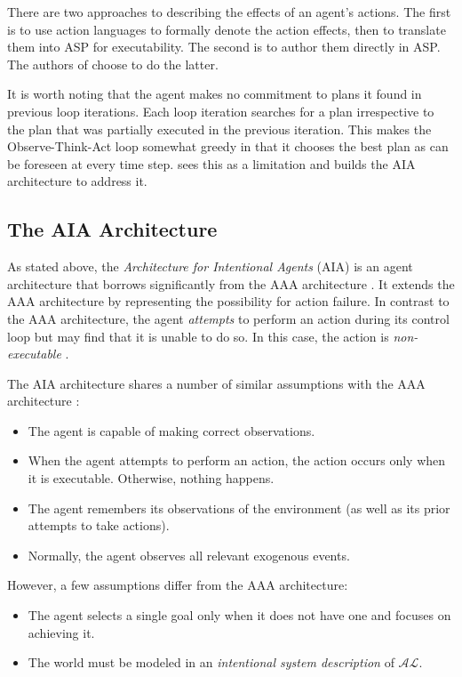 There are two approaches to describing the effects of an agent's actions.
The first is to use action languages to formally denote the action effects, then to translate them into ASP for executability.
The second is to author them directly in ASP.
The authors of \cite{balduccini_aaa_2008} choose to do the latter.

It is worth noting that the agent makes no commitment to plans it found in previous loop iterations.
Each loop iteration searches for a plan irrespective to the plan that was partially executed in the previous iteration.
This makes the Observe-Think-Act loop somewhat greedy in that it chooses the best plan as can be foreseen at every time step.
\cite{blount_towards_2014} sees this as a limitation and builds the AIA architecture to address it.

\subsection{The AIA Architecture}
\label{subsec:aia_architecture}

As stated above, the \textit{Architecture for Intentional Agents} (AIA) is an agent architecture that borrows significantly from the AAA architecture \cite{blount_towards_2014}.
It extends the AAA architecture by representing the possibility for action failure.
In contrast to the AAA architecture, the agent \textit{attempts} to perform an action during its control loop but may find that it is unable to do so.
In this case, the action is \textit{non-executable} \cite{blount_towards_2014}.

The AIA architecture shares a number of similar assumptions with the AAA architecture \cite{blount_towards_2014}:

\begin{itemize}
    \item The agent is capable of making correct observations.
    \item When the agent attempts to perform an action, the action occurs only when it is executable.
        Otherwise, nothing happens.
    \item The agent remembers its observations of the environment (as well as its prior attempts to take actions).
    \item Normally, the agent observes all relevant exogenous events.
\end{itemize}

However, a few assumptions differ from the AAA architecture:

\begin{itemize}
    \item The agent selects a single goal only when it does not have one and focuses on achieving it.
    \item The world must be modeled in an \textit{intentional system description} of $\mathcal{AL}$.
\end{itemize}

